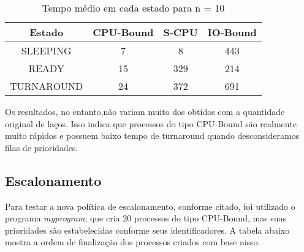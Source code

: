 \documentclass{article}
\begin{document}
\begin{table}[H]
      \centering
      \begin{tabular}{|c|c|c|c|}
            \hline
            Estado     & CPU-Bound & S-CPU &
            IO-Bound                             \\
            \hline
            SLEEPING   & 7         & 8     & 443 \\
            READY      & 15        & 329   & 214 \\
            TURNAROUND & 24        & 372   & 691 \\
            \hline
      \end{tabular}
      \caption{Tempo médio em cada estado para n = 10}
\end{table}

Os resultados, no entanto,não variam muito dos obtidos com a quantidade
original de laços. Isso indica que processos do tipo CPU-Bound são realmente
muito rápidos e possuem baixo tempo de turnaround quando desconsideramos filas
de prioridades.

\subsection{Escalonamento}

Para testar a nova política de escalonamento, conforme citado, foi utilizado o
programa \textit{myprogram}, que cria 20 processos do tipo
CPU-Bound, mas suas prioridades são estabelecidas conforme seus
identificadores. A tabela abaixo mostra a ordem de finalização dos processos
criados com base nisso.
\end{document}
